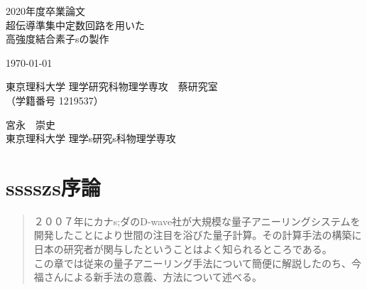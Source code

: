 \documentclass[]{jsbook}
\begin{document}
\begin{titlepage}
    \begin{center}
        {\Large 2020年度卒業論文}\\
        \vspace{180truept}
        {\Huge 超伝導準集中定数回路を用いた\\
        \vspace{10truept}
        高強度結合素子sの製作}\\ 
        \vspace{70truept}

        {\Large \today}\\

        \vspace{70truept}

        {\Large 東京理科大学 理学研究科物理学専攻　蔡研究室\\
        （学籍番号 1219537）}\\

        \vspace{20truept}

        {\huge 宮永　崇史}\\

        \vspace{160truept}
        {\Large 東京理科大学 理学s研究s科物理学専攻}\\
    \end{center}
\end{titlepage}
\frontmatter
{}

\tableofcontents
\mainmatter

\chapter{sssszs序論}
    \begin{abstract}
        ２００７年にカナs;ダのD-wave社が大規模な量子アニーリングシステムを開発したことにより世間の注目を浴びた量子計算。その計算手法の構築に日本の研究者が関与したということはよく知られるところである。\\
        この章では従来の量子アニーリング手法について簡便に解説したのち、今福さんによる新手法の意義、方法について述べる。\\

    \end{abstract}
    
\end{document}

